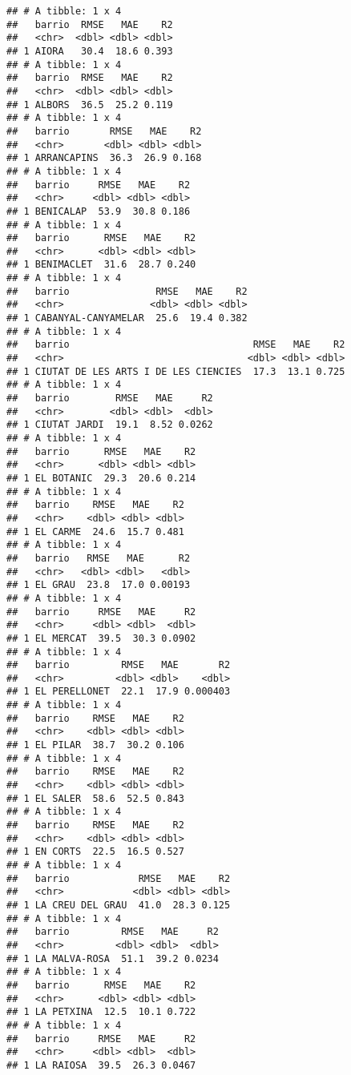 \documentclass[
]{article}
\begin{document}
\begin{verbatim}
## # A tibble: 1 x 4
##   barrio  RMSE   MAE    R2
##   <chr>  <dbl> <dbl> <dbl>
## 1 AIORA   30.4  18.6 0.393
## # A tibble: 1 x 4
##   barrio  RMSE   MAE    R2
##   <chr>  <dbl> <dbl> <dbl>
## 1 ALBORS  36.5  25.2 0.119
## # A tibble: 1 x 4
##   barrio       RMSE   MAE    R2
##   <chr>       <dbl> <dbl> <dbl>
## 1 ARRANCAPINS  36.3  26.9 0.168
## # A tibble: 1 x 4
##   barrio     RMSE   MAE    R2
##   <chr>     <dbl> <dbl> <dbl>
## 1 BENICALAP  53.9  30.8 0.186
## # A tibble: 1 x 4
##   barrio      RMSE   MAE    R2
##   <chr>      <dbl> <dbl> <dbl>
## 1 BENIMACLET  31.6  28.7 0.240
## # A tibble: 1 x 4
##   barrio               RMSE   MAE    R2
##   <chr>               <dbl> <dbl> <dbl>
## 1 CABANYAL-CANYAMELAR  25.6  19.4 0.382
## # A tibble: 1 x 4
##   barrio                                RMSE   MAE    R2
##   <chr>                                <dbl> <dbl> <dbl>
## 1 CIUTAT DE LES ARTS I DE LES CIENCIES  17.3  13.1 0.725
## # A tibble: 1 x 4
##   barrio        RMSE   MAE     R2
##   <chr>        <dbl> <dbl>  <dbl>
## 1 CIUTAT JARDI  19.1  8.52 0.0262
## # A tibble: 1 x 4
##   barrio      RMSE   MAE    R2
##   <chr>      <dbl> <dbl> <dbl>
## 1 EL BOTANIC  29.3  20.6 0.214
## # A tibble: 1 x 4
##   barrio    RMSE   MAE    R2
##   <chr>    <dbl> <dbl> <dbl>
## 1 EL CARME  24.6  15.7 0.481
## # A tibble: 1 x 4
##   barrio   RMSE   MAE      R2
##   <chr>   <dbl> <dbl>   <dbl>
## 1 EL GRAU  23.8  17.0 0.00193
## # A tibble: 1 x 4
##   barrio     RMSE   MAE     R2
##   <chr>     <dbl> <dbl>  <dbl>
## 1 EL MERCAT  39.5  30.3 0.0902
## # A tibble: 1 x 4
##   barrio         RMSE   MAE       R2
##   <chr>         <dbl> <dbl>    <dbl>
## 1 EL PERELLONET  22.1  17.9 0.000403
## # A tibble: 1 x 4
##   barrio    RMSE   MAE    R2
##   <chr>    <dbl> <dbl> <dbl>
## 1 EL PILAR  38.7  30.2 0.106
## # A tibble: 1 x 4
##   barrio    RMSE   MAE    R2
##   <chr>    <dbl> <dbl> <dbl>
## 1 EL SALER  58.6  52.5 0.843
## # A tibble: 1 x 4
##   barrio    RMSE   MAE    R2
##   <chr>    <dbl> <dbl> <dbl>
## 1 EN CORTS  22.5  16.5 0.527
## # A tibble: 1 x 4
##   barrio            RMSE   MAE    R2
##   <chr>            <dbl> <dbl> <dbl>
## 1 LA CREU DEL GRAU  41.0  28.3 0.125
## # A tibble: 1 x 4
##   barrio         RMSE   MAE     R2
##   <chr>         <dbl> <dbl>  <dbl>
## 1 LA MALVA-ROSA  51.1  39.2 0.0234
## # A tibble: 1 x 4
##   barrio      RMSE   MAE    R2
##   <chr>      <dbl> <dbl> <dbl>
## 1 LA PETXINA  12.5  10.1 0.722
## # A tibble: 1 x 4
##   barrio     RMSE   MAE     R2
##   <chr>     <dbl> <dbl>  <dbl>
## 1 LA RAIOSA  39.5  26.3 0.0467

\end{verbatim}
\end{document}
